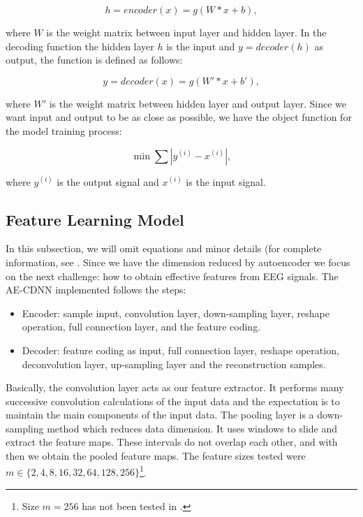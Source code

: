\begin{equation}
h = encoder(x) = g(W*x+b),
\end{equation}

where $W$ is the weight matrix between input layer and hidden layer. In the decoding function the hidden layer $h$ is the input and $y = decoder(h)$ as output, the function is defined as follows:

\begin{equation}
y = decoder(x) = g(W'*x + b'),
\end{equation}

where $W'$ is the weight matrix between hidden layer and output layer. Since we want input and output to be as close as possible, we have the object function for the model training process:

\begin{equation}
\min \sum |y^{(i)} - x^{(i)}|,
\end{equation}

where $y^{(i)}$ is the output signal and $x^{(i)}$ is the input signal.

\subsection{Feature Learning Model}

In this subsection, we will omit equations and minor details (for complete information, see \cite{Shoeb,emami2019autoencoding}. Since we have the dimension reduced by autoencoder we focus on the next challenge: how to obtain effective features from EEG signals.  The AE-CDNN implemented follows the steps:

\begin{itemize}
\item Encoder: sample input, convolution layer, down-sampling layer, reshape operation, full connection layer, and the feature coding.
\item Decoder: feature coding as input, full 
connection layer, reshape operation, deconvolution layer, up-sampling layer and the reconstruction samples.
\end{itemize}

Basically, the convolution layer acts as our feature extractor. It performs many successive convolution calculations of the input data and the expectation is to maintain the main components of the input data. The pooling layer is a down-sampling method which reduces data dimension. It uses windows to slide and extract the feature maps. These intervals do not overlap each other, and with then we obtain the pooled feature maps. The feature sizes tested were $m \in \{2, 4, 8, 16, 32, 64, 128, 256\}$\footnote{Size $m = 256$ has not been tested in \cite{WenZha:2018}.}.


